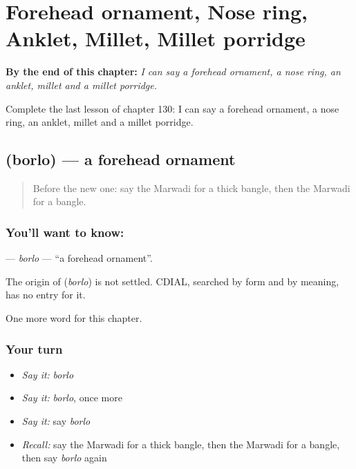 
\chapter{Forehead ornament, Nose ring, Anklet, Millet, Millet porridge}
\label{ch:mw-forehead-ornament-nose-ring-anklet-millet-millet-porridge}

\begin{chapteropening}
\textbf{By the end of this chapter:} \emph{I can say a forehead ornament, a nose ring, an anklet, millet and a millet porridge.}

Complete the last lesson of chapter 130: I can say a forehead ornament, a nose ring, an anklet, millet and a millet porridge.
\end{chapteropening}

\section[\texorpdfstring{\mw{बोरलो} (borlo)}{बोरलो (borlo)}]{ (borlo) — a forehead ornament}

\label{lesson:MW-C130-borlo}



\begin{quote}
Before the new one: say the Marwadi for a thick bangle, then the Marwadi for a bangle.
\end{quote}

\subsection*{You'll want to know: }
\textbf{} — \emph{borlo} — \textquotedblleft{}a forehead ornament\textquotedblright{}.

\begin{cousinweb}
The origin of \textbf{} (\emph{borlo}) is not settled. CDIAL, searched by form and by meaning, has no entry for it.
\end{cousinweb}

\begin{grammarlens}[title={What you've built}]
One more word for this chapter.
\end{grammarlens}

\subsection*{Your turn}
\begin{itemize}
\raggedright
  \item \emph{Say it:} \emph{borlo}
  \item \emph{Say it:} \emph{borlo}, once more
  \item \emph{Say it:} say \emph{borlo}
  \item \emph{Recall:} say the Marwadi for a thick bangle, then the Marwadi for a bangle, then say \emph{borlo} again
\end{itemize}

